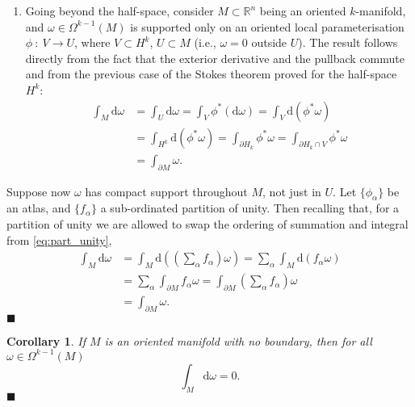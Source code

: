 \documentclass[letter-paper]{tufte-book}
\newtheorem{corollary}[theorem]{\color{pastel-blue}Corollary}
\newenvironment{proof}[1][Proof]{\begin{trivlist}
\item[\hskip \labelsep {\bfseries #1}]}{\end{trivlist}}
\newcommand{\qed}{\hfill$\blacksquare$}
\begin{document}
\begin{proof}
\begin{enumerate}
    \item Going beyond the half-space, consider $M \subset \mathbb{R}^n$ being an oriented $k$-manifold, and $\omega \in \Omega^{k-1}(M)$ is supported only on an oriented local parameterisation $\phi\ :\ V \to U$, where $V \subset H^k$, $U \subset M$ (i.e., $\omega = 0$ outside $U$). The result follows directly from the fact that the exterior derivative and the pullback commute and from the previous case of the Stokes theorem proved for the half-space $H^k$:
    \begin{align*}
      \int_M \mathrm{d}\omega
        &= \int_U \mathrm{d}\omega = \int_V \phi^* (\mathrm{d}\omega) = \int_V \mathrm{d}(\phi^* \omega) \\
        & = \int_{H^k} \mathrm{d}(\phi^* \omega) = \int_{\partial H_k} \phi^* \omega = \int_{\partial H_k \cap V} \phi^* \omega\\
        &= \int_{\partial M} \omega.
    \end{align*}
  \end{enumerate}
  
  \item Suppose now $\omega$ has compact support throughout $M$, not just in $U$. Let $\{\phi_\alpha\}$ be an atlas, and $\{f_\alpha\}$ a sub-ordinated partition of unity. Then recalling that, for a partition of unity we are allowed to swap the ordering of summation and integral from \eqref{eq:part_unity},
  \begin{align*}
    \int_M \mathrm{d}\omega
      &= \int_M \mathrm{d}\left((\sum_\alpha f_\alpha)\omega\right) = \sum_\alpha \int_M \mathrm{d}(f_\alpha \omega)\\
      &= \sum_\alpha \int_{\partial M} f_\alpha \omega = \int_{\partial M} \left(\sum_\alpha f_\alpha\right) \omega \\
      &= \int_{\partial M}\omega.
  \end{align*}
  \qed
\end{proof}

\begin{corollary}
  If $M$ is an oriented manifold with no boundary, then for all $\omega \in \Omega^{k-1}(M)$
  \begin{equation*}
    \int_M \mathrm{d}\omega = 0.
  \end{equation*}
  \qed
\end{corollary}


\end{document}
